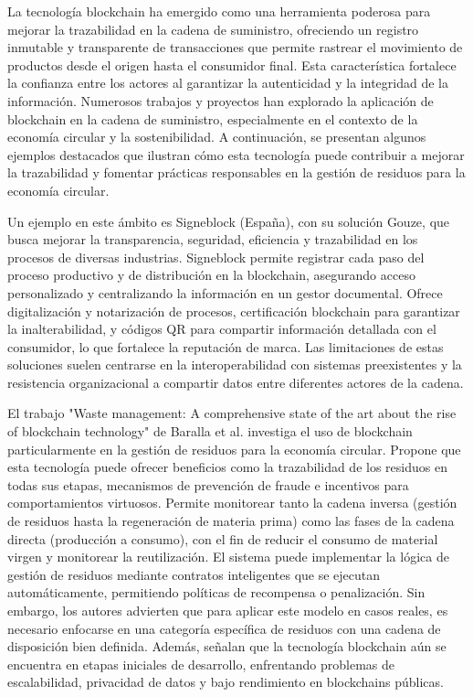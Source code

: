 La tecnología blockchain ha emergido como una herramienta poderosa para mejorar la trazabilidad en la cadena de suministro, ofreciendo un registro inmutable y transparente de transacciones que permite rastrear el movimiento de productos desde el origen hasta el consumidor final. Esta característica fortalece la confianza entre los actores al garantizar la autenticidad y la integridad de la información. Numerosos trabajos y proyectos han explorado la aplicación de blockchain en la cadena de suministro, especialmente en el contexto de la economía circular y la sostenibilidad. A continuación, se presentan algunos ejemplos destacados que ilustran cómo esta tecnología puede contribuir a mejorar la trazabilidad y fomentar prácticas responsables en la gestión de residuos para la economía circular.

Un ejemplo en este ámbito es Signeblock (España), con su solución Gouze, que busca mejorar la transparencia, seguridad, eficiencia y trazabilidad en los procesos de diversas industrias. Signeblock permite registrar cada paso del proceso productivo y de distribución en la blockchain, asegurando acceso personalizado y centralizando la información en un gestor documental. Ofrece digitalización y notarización de procesos, certificación blockchain para garantizar la inalterabilidad, y códigos QR para compartir información detallada con el consumidor, lo que fortalece la reputación de marca. Las limitaciones de estas soluciones suelen centrarse en la interoperabilidad con sistemas preexistentes y la resistencia organizacional a compartir datos entre diferentes actores de la cadena.

El trabajo "Waste management: A comprehensive state of the art about the rise of blockchain technology" de Baralla et al. investiga el uso de blockchain particularmente en la gestión de residuos para la economía circular. Propone que esta tecnología puede ofrecer beneficios como la trazabilidad de los residuos en todas sus etapas, mecanismos de prevención de fraude e incentivos para comportamientos virtuosos. Permite monitorear tanto la cadena inversa (gestión de residuos hasta la regeneración de materia prima) como las fases de la cadena directa (producción a consumo), con el fin de reducir el consumo de material virgen y monitorear la reutilización. El sistema puede implementar la lógica de gestión de residuos mediante contratos inteligentes que se ejecutan automáticamente, permitiendo políticas de recompensa o penalización. Sin embargo, los autores advierten que para aplicar este modelo en casos reales, es necesario enfocarse en una categoría específica de residuos con una cadena de disposición bien definida. Además, señalan que la tecnología blockchain aún se encuentra en etapas iniciales de desarrollo, enfrentando problemas de escalabilidad, privacidad de datos y bajo rendimiento en blockchains públicas.

